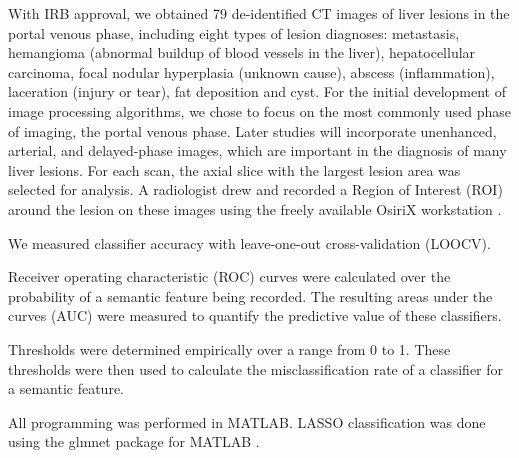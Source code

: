 With IRB approval, we obtained 79 de-identified CT images of liver lesions in the portal venous phase, including eight types of lesion diagnoses: metastasis, hemangioma (abnormal buildup of blood vessels in the liver), hepatocellular carcinoma, focal nodular hyperplasia (unknown cause), abscess (inflammation), laceration (injury or tear), fat deposition and cyst. For the initial development of image processing algorithms, we chose to focus on the most commonly used phase of imaging, the portal venous phase. Later studies will incorporate unenhanced, arterial, and delayed-phase images, which are important in the diagnosis of many liver lesions. For each scan, the axial slice with the largest lesion area was selected for analysis. A radiologist drew and recorded a Region of Interest (ROI) around the lesion on these images using the freely available OsiriX workstation \cite{Armato:2007ks,Rosset:2004kk}.


We measured classifier accuracy with leave-one-out cross-validation (LOOCV). 

Receiver operating characteristic (ROC) curves were calculated over the probability of a semantic feature being recorded. The resulting areas under the curves (AUC) were measured to quantify the predictive value of these classifiers.

Thresholds were determined empirically over a range from 0 to 1. These thresholds were then used to calculate the misclassification rate of a classifier for a semantic feature.

All programming was performed in MATLAB. LASSO classification was done using the glmnet package for MATLAB \cite{Friedman:2009wm}.